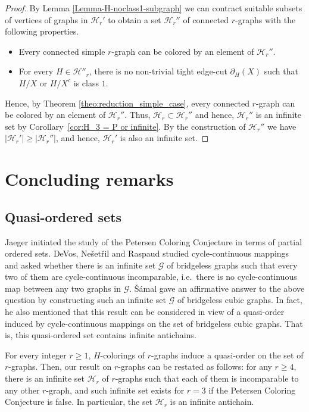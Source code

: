 \documentclass[a4paper,11pt]{article}
\newcommand{\ca}{\mathcal}
\theoremstyle{remark}
\begin{document}
\begin{proof}
	By Lemma \ref{Lemma-H-noclass1-subgraph} we can contract suitable subsets of vertices of graphs in $\ca H_r'$ to obtain a set $\ca H_r''$ of connected $r$-graphs with the following properties.
\begin{itemize}
\item Every connected simple $r$-graph can be colored by an element of $\ca H_r''$.
\item For every $H \in \ca H''_r$, there is no non-trivial tight edge-cut $\partial_H(X)$ such that $H/X$ or $H/X^c$ is class $1$.
\end{itemize}	
Hence, by Theorem \ref{theo:reduction_simple_case}, every connected $r$-graph can be colored by an element of $\ca H_r''$. Thus, $\ca H_r \subset \ca H_r''$ and hence, $\ca H_r''$ is an infinite set by Corollary~\ref{cor:H_3 = P or infinite}. By the construction of $\ca H_r''$ we have $|\ca H_r'| \geq |\ca H_r''|$, and hence, $\ca H_r'$ is also an infinite set.
\end{proof}



\section{Concluding remarks} \label{Sec: final remarks}

\subsection{Quasi-ordered sets}
Jaeger \cite{Jaeger1980} initiated the study of the Petersen Coloring Conjecture in terms of partial ordered sets. DeVos, Ne\v{s}et\v{r}il and Raspaud \cite{DeVos_etal_2007} studied cycle-continuous mappings and asked whether there is an infinite set $ \ca G $ of  bridgeless graphs such that every two of them are cycle-continuous incomparable, i.e.\ there is no cycle-continuous map between any two graphs in $\ca G$.
\v{S}\'amal \cite{Robert_2017} gave an affirmative answer to the above question by constructing such an infinite set $ \ca G $ of  bridgeless cubic graphs.
In fact, he also mentioned that
this result can be considered in view of a quasi-order induced by cycle-continuous mappings on the set of bridgeless cubic graphs. That is, this quasi-ordered set contains infinite antichains.

For every integer $r \geq 1$, $H$-colorings of $r$-graphs induce a quasi-order on the set of $r$-graphs.
Then, our result on $ r $-graphs can be restated  as follows: for any $ r\geq4 $, there is an infinite set $ \ca H_r $ of  $ r $-graphs such that each of them  is  incomparable to any other $ r $-graph, and such infinite set exists for $ r=3 $ if the Petersen Coloring Conjecture is false.  
In particular, the set $\ca H_r $ is an infinite antichain.
 
\end{document}
